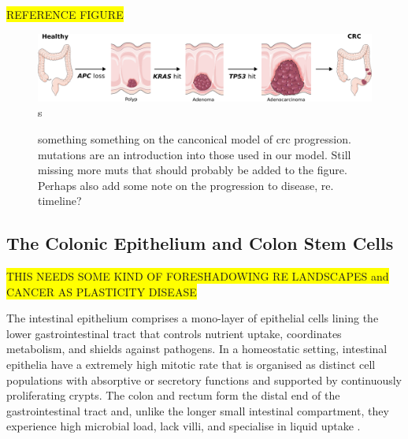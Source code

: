\colorbox{yellow}{REFERENCE FIGURE }

\begin{figure} 
    \centering
    \includegraphics{01intro/figs/1BIO_CRC.png}s
    \caption{something something on the canconical model of crc progression. mutations are an introduction into those used in our model. Still missing more muts that should probably be added to the figure. Perhaps also add some note on the progression to disease, re. timeline?}
    \label{fig:fig1}
\end{figure}


\subsection{The Colonic Epithelium and Colon Stem Cells}

\colorbox{yellow}{THIS NEEDS SOME KIND OF FORESHADOWING RE LANDSCAPES and CANCER AS PLASTICITY DISEASE}


The intestinal epithelium comprises a mono-layer of epithelial cells lining the lower gastrointestinal tract that controls nutrient uptake, coordinates metabolism, and shields against pathogens. In a homeostatic setting, intestinal epithelia have a extremely high mitotic rate that is organised as distinct cell populations with absorptive or secretory functions and supported by continuously proliferating crypts\cite{bonis_intestinal_2021}. The colon and rectum form the distal end of the gastrointestinal tract and, unlike the longer small intestinal compartment, they experience high microbial load, lack villi, and specialise in liquid uptake \cite{kiela_physiology_2016}.

